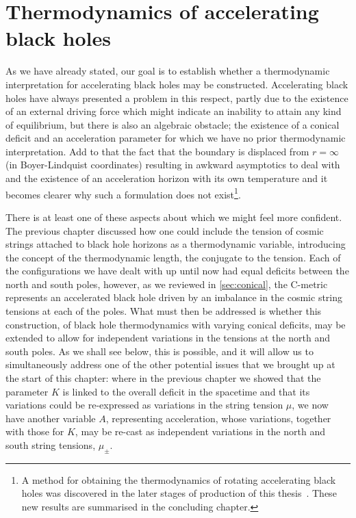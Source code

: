 \documentclass[
twoside,
openright,
frontopenright,
]{dmathesis}
\begin{document}
\chapter{Thermodynamics of accelerating black holes}
\label{cha:therm-accel-black}

As we have already stated, our goal is to establish whether a thermodynamic
interpretation for accelerating black holes may be constructed. Accelerating
black holes have always presented a problem in this respect, partly due to the
existence of an external driving force which might indicate an inability to
attain any kind of equilibrium, but there is also an algebraic obstacle; the
existence of a conical deficit and an acceleration parameter for which we have
no prior thermodynamic interpretation. Add to that the fact that the boundary is
displaced from $r = \infty$ (in Boyer-Lindquist coordinates) resulting in
awkward asymptotics to deal with and the existence of an acceleration horizon
with its own temperature and it becomes clearer why such a formulation does not
exist\footnote{A method for obtaining the thermodynamics of rotating
  accelerating black holes was discovered in the later stages of production of
  this thesis~\cite{Anabalon:2018aa}. These new results are summarised in the
  concluding chapter.}.

There is at least one of these aspects about which we might feel more
confident. The previous chapter discussed how one could include the tension of
cosmic strings attached to black hole horizons as a thermodynamic variable,
introducing the concept of the thermodynamic length, the conjugate to the
tension. Each of the configurations we have dealt with up until now had equal
deficits between the north and south poles, however, as we reviewed in
\cref{sec:conical}, the C-metric represents an accelerated black hole driven by
an imbalance in the cosmic string tensions at each of the poles. What must then
be addressed is whether this construction, of black hole thermodynamics with
varying conical deficits, may be extended to allow for independent variations in
the tensions at the north and south poles. As we shall see below, this is
possible, and it will allow us to simultaneously address one of the other
potential issues that we brought up at the start of this chapter: where in the
previous chapter we showed that the parameter $K$ is linked to the overall
deficit in the spacetime and that its variations could be re-expressed as
variations in the string tension $\mu$, we now have another variable $A$,
representing acceleration, whose variations, together with those for $K$, may be
re-cast as independent variations in the north and south string tensions,
$\mu_\pm$.
\end{document}
